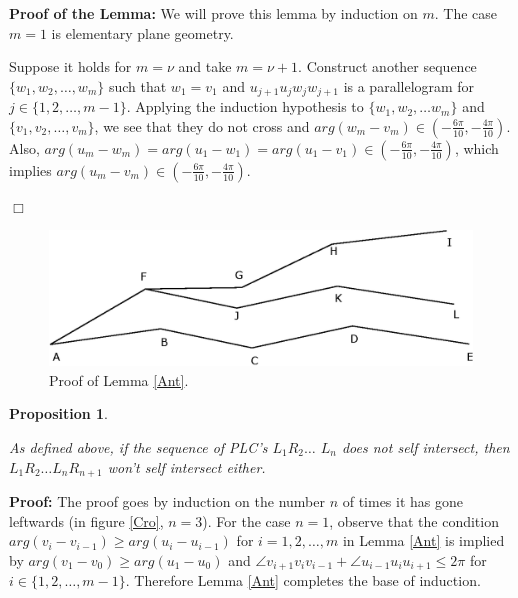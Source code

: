\documentclass[openright, 12pt]{article}
\newtheorem{prop}[teorema]{Proposition}
\begin{document}
\textbf{Proof of the Lemma: }We will prove this lemma by induction on $m$. The case $m=1$ is elementary plane geometry.


Suppose it holds for $m=\nu$ and take $m = \nu +1$. Construct another sequence $\{ w_1, w_2, \ldots, w_m   \}$ such that $w_1 = v_1$ and $u_{j+1}u_jw_jw_{j+1} $ is a parallelogram for $j \in \{ 1, 2, \ldots , m-1\} $. Applying the induction hypothesis to $\{ w_1, w_2, \ldots w_m   \}$ and $\{v_1, v_2, \ldots, v_m  \}$, we see that they do not cross and $arg( w_{m} - v_m) \in \left( - \frac{6 \pi}{10} , -\frac{4\pi}{10}  \right)$. Also, $arg(u_m - w_m )= arg (u_1 - w_1) = arg (u_1 - v_1) \in \left( - \frac{6 \pi}{10} , -\frac{4\pi}{10}  \right)$, which implies $arg(u_m - v_m)\in \left( - \frac{6 \pi}{10} , -\frac{4\pi}{10}  \right)$.

\hfill $\Box$


\begin{figure}[h]
\centering
{}
\includegraphics[scale=0.95]{arms.eps}
\caption{Proof of Lemma \ref{Ant}.}
\end{figure}





\begin{prop}\label{Zig}
{\rm As defined above, if the sequence of PLC's $L_1R_2\ldots$ 
$ L_n$ does not self intersect, then $L_1 R_2 \ldots L_nR_{n+1}$ won't self intersect either.  

}
\end{prop}




\textbf{Proof: }The proof goes by induction on the number $n$ of times it has gone leftwards (in figure \ref{Cro}, $n=3$). For the case $n=1$, observe that the condition $arg (v_{i} - v_{i-1} )\geq arg (u_{i} - u_{i-1})$ for $i =1, 2, \ldots, m$ in Lemma \ref{Ant} is implied by $arg (v_1 - v_0 )\geq arg (u_1 - u_0)$ and $\angle v_{i+1}v_iv_{i-1}+ \angle u_{i-1}u_iu_{i+1} \leq 2\pi$ for $i\in \{ 1,2, \ldots, m-1\}$. Therefore Lemma \ref{Ant} completes the base of induction.
\end{document}
